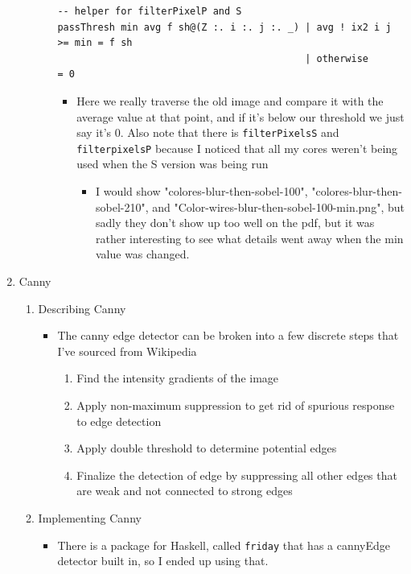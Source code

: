 \documentclass{article}
\begin{document}
\begin{enumerate}
\begin{enumerate}
\begin{itemize}
\begin{verbatim}
-- helper for filterPixelP and S
passThresh min avg f sh@(Z :. i :. j :. _) | avg ! ix2 i j >= min = f sh
                                           | otherwise            = 0
\end{verbatim}
\begin{itemize}
\item Here we really traverse the old image and compare it with the
average value at that point, and if it's below our threshold we just
say it's 0. Also note that there is \texttt{filterPixelsS} and
\texttt{filterpixelsP} because I noticed that all my cores weren't being
used when the S version was being run
\begin{itemize}
\item I would show "colores-blur-then-sobel-100",
"colores-blur-then-sobel-210", and
"Color-wires-blur-then-sobel-100-min.png", but sadly they don't
show up too well on the pdf, but it was rather interesting to
see what details went away when the min value was changed.
\end{itemize}
\end{itemize}
\end{itemize}
\end{enumerate}
\item Canny
\label{sec-1-2}
\begin{enumerate}
\item Describing Canny
\label{sec-1-2-1}
\begin{itemize}
\item The canny edge detector can be broken into a few discrete steps that
I've sourced from Wikipedia
\begin{enumerate}
\item Find the intensity gradients of the image
\item Apply non-maximum suppression to get rid of spurious response to
edge detection
\item Apply double threshold to determine potential edges
\item Finalize the detection of edge by suppressing all other edges
that are weak and not connected to strong edges
\end{enumerate}
\end{itemize}
\item Implementing Canny
\label{sec-1-2-2}
\begin{itemize}
\item There is a package for Haskell, called \texttt{friday} that has a cannyEdge
detector built in, so I ended up using that.
\begin{verbatim}

\end{verbatim}
\end{itemize}
\end{enumerate}
\end{enumerate}
\end{document}
